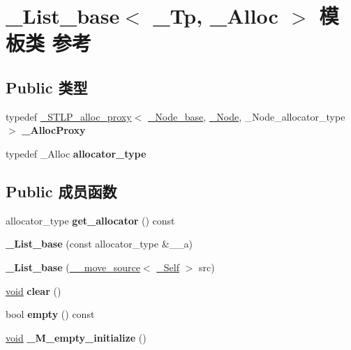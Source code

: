 \hypertarget{class___list__base}{}\section{\+\_\+\+List\+\_\+base$<$ \+\_\+\+Tp, \+\_\+\+Alloc $>$ 模板类 参考}
\label{class___list__base}
\subsection*{Public 类型}
\begin{DoxyCompactItemize}
\item 
\mbox{\label{class___list__base_a898d666fadd9cf6150fa277a13880435}} 
typedef \hyperlink{class___s_t_l_p__alloc__proxy}{\+\_\+\+S\+T\+L\+P\+\_\+alloc\+\_\+proxy}$<$ \hyperlink{struct___list__node__base}{\+\_\+\+Node\+\_\+base}, \hyperlink{class___list__node}{\+\_\+\+Node}, \+\_\+\+Node\+\_\+allocator\+\_\+type $>$ {\bfseries \+\_\+\+Alloc\+Proxy}
\item 
\mbox{\label{class___list__base_a3f110d9db8e3ea4ae59a2364386a9797}} 
typedef \+\_\+\+Alloc {\bfseries allocator\+\_\+type}
\end{DoxyCompactItemize}
\subsection*{Public 成员函数}
\begin{DoxyCompactItemize}
\item 
\mbox{\label{class___list__base_ae610c3c8e0ac8186e6b8d4ed9de20b91}} 
allocator\+\_\+type {\bfseries get\+\_\+allocator} () const
\item 
\mbox{\label{class___list__base_a46dfc5167022c1c99d6538128c90df67}} 
{\bfseries \+\_\+\+List\+\_\+base} (const allocator\+\_\+type \&\+\_\+\+\_\+a)
\item 
\mbox{\label{class___list__base_ad3af55eb4e6e679af8441408bb3967cc}} 
{\bfseries \+\_\+\+List\+\_\+base} (\hyperlink{class____move__source}{\+\_\+\+\_\+move\+\_\+source}$<$ \hyperlink{class___list__base}{\+\_\+\+Self} $>$ src)
\item 
\mbox{\label{class___list__base_a26fb496bb26d4f5d5f24a359fef04ffe}} 
\hyperlink{interfacevoid}{void} {\bfseries clear} ()
\item 
\mbox{\label{class___list__base_a1f16b83d3b00989f6ee916afc6aff50c}} 
bool {\bfseries empty} () const
\item 
\mbox{\label{class___list__base_a1da5743fb7b1f9a226a26a1c789eed51}} 
\hyperlink{interfacevoid}{void} {\bfseries \+\_\+\+M\+\_\+empty\+\_\+initialize} ()
\end{DoxyCompactItemize}
